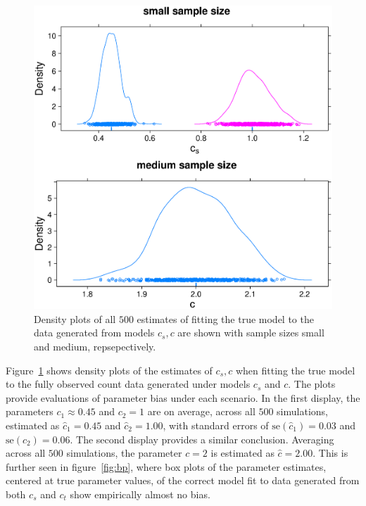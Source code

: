 \begin{figure}
  \centering
  \includegraphics[scale=0.5]{nonem}
  \caption{Density plots of all $500$ estimates of fitting the true model to the data generated from models $c_s,c$ are shown with sample sizes small and medium, repsepectively.}
  \label{fig:nonem}
\end{figure}


Figure~\ref{fig:nonem} shows density plots of the estimates of $c_s, c$ when fitting the true model to the fully observed count data generated under models $c_s$ and $c$.  The plots provide evaluations of parameter bias under each scenario.  In the first display, the parameters $c_1 \approx 0.45$ and $c_2 = 1$ are on average, across all $500$ simulations, estimated as $\hat{c}_1 = 0.45$ and $\hat{c}_2 = 1.00$, with standard errors of $\text{se}(\hat{c}_1) = 0.03$ and $\text{se}(\hat{c}_2) = 0.06$.  The second display provides a similar conclusion.  Averaging across all $500$ simulations, the parameter $c=2$ is estimated as $\hat{c} = 2.00$.  This is further seen in figure~\ref{fig:bp}, where box plots of the parameter estimates, centered at true parameter values, of the correct model fit to data generated from both $c_s$ and $c_t$ show empirically almost no bias.

